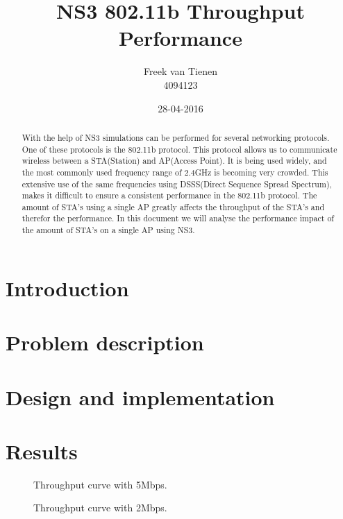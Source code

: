 \documentclass[]{article}
\begin{document}


\title{NS3 802.11b Throughput Performance}
\author{Freek van Tienen \\ 4094123}
\date{28-04-2016}
\maketitle

\begin{abstract}
With the help of NS3 simulations can be performed for several networking protocols.
One of these protocols is the 802.11b protocol.
This protocol allows us to communicate wireless between a STA(Station) and AP(Access Point).
It is being used widely, and the most commonly used frequency range of 2.4GHz is becoming very crowded.
This extensive use of the same frequencies using DSSS(Direct Sequence Spread Spectrum), makes it difficult to ensure a consistent performance in the 802.11b protocol.
The amount of STA's using a single AP greatly affects the throughput of the STA's and therefor the performance.
In this document we will analyse the performance impact of the amount of STA's on a single AP using NS3.
\end{abstract}

\section{Introduction}

\section{Problem description}

\section{Design and implementation}

\section{Results}

\begin{figure}
    
   \caption{Throughput curve with 5Mbps.\label{fig:tp_5}}
\end{figure}

\begin{figure}
    
   \caption{Throughput curve with 2Mbps.\label{fig:tp_2}}
\end{figure}
\end{document}
